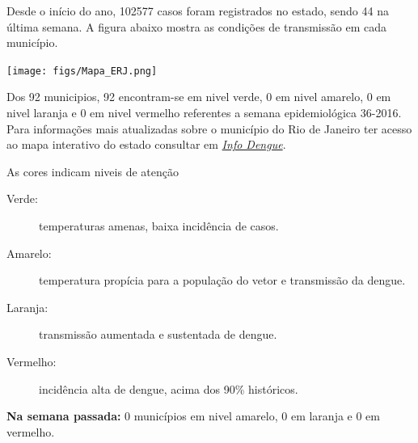 \documentclass[10pt]{article} %
\begin{document}
\begin{minipage}[t]{.66\linewidth} %

\hypertarget{estado}{} %

Desde o início do ano, 102577 casos foram registrados no estado, sendo 44 na última semana. A figura abaixo mostra as condições de transmissão em cada município.

\texttt{[image: figs/Mapa\_ERJ.png]}

Dos 92 municipios, 92 encontram-se em nivel verde, 0 em nivel amarelo, 0 em nivel laranja e 0 em nivel vermelho referentes a semana epidemiológica 36-2016. Para informações mais atualizadas
sobre o município do Rio de Janeiro ter acesso ao mapa interativo do estado consultar em \href{http://info.dengue.mat.br}{\textit{Info Dengue}}.


\vspace{1cm}
\begin{mdframed}[style=intextbox,frametitle={}] %

\hypertarget{descriptivebox}{} %
As cores indicam niveis de atenção
\begin{description}
\item[Verde:] temperaturas amenas, baixa incidência de casos.      
\item[Amarelo:] temperatura propícia para a população do vetor e transmissão da dengue.
\item[Laranja:] transmissão aumentada e sustentada de dengue. 
\item[Vermelho:] incidência alta de dengue, acima dos 90\% históricos.
\end{description}
\end{mdframed}

 \textbf{Na semana passada:} 0 municípios em nivel amarelo, 0 em laranja e 0 em vermelho.    

\end{minipage} %
\end{document}
